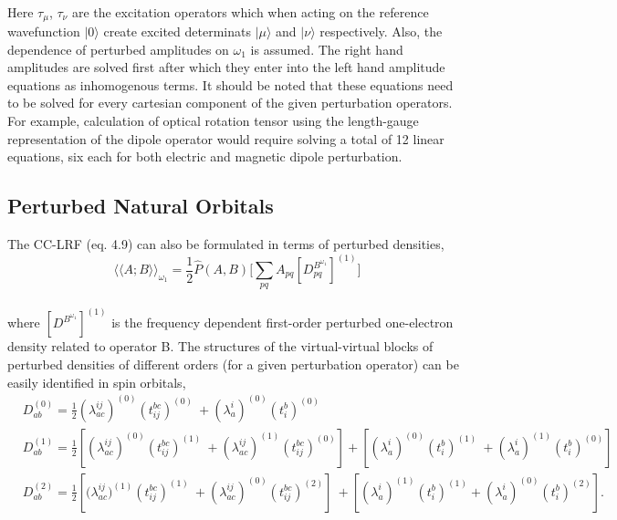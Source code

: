 \\
Here $\tau_\mu$, $\tau_\nu$ are the excitation operators which when acting on the
reference wavefunction $|0\rangle$ create excited determinats $|\mu\rangle$ 
and $|\nu\rangle$ respectively. Also, the dependence of perturbed amplitudes
 on $\omega_1$ is assumed. The right hand amplitudes are solved first after 
which they enter into the left hand amplitude equations as inhomogenous terms. 
It should be noted that these equations need to be solved for every cartesian 
component of the given perturbation operators. For example, calculation of 
optical rotation tensor using the length-gauge representation of the dipole 
operator would require solving a total of 12 linear equations, six each 
for both electric and magnetic dipole perturbation.
\subsection{Perturbed Natural Orbitals}
The CC-LRF (eq. 4.9) can also be formulated in terms of perturbed densities,
\\
\begin{equation}
{\langle\langle A;B\rangle\rangle}_{\omega_1} =  \frac{1}{2}\hat{P}(A,B)\big[\sum_{pq} A_{pq}[{D^{B^{\omega_1}}_{pq}}]^{(1)}\big]
\end{equation}
\\
where $[{D^{B^{\omega_1}}}]^{(1)}$ is the frequency dependent first-order
perturbed one-electron density related to operator B. The structures  
of the virtual-virtual blocks of perturbed densities of different orders
(for a given perturbation operator) can be easily identified in spin orbitals,
\\
\begin{equation}
\begin{split}
& D^{(0)}_{ab} = \frac{1}{2}(\lambda^{ij}_{ac})^{(0)}(t^{bc}_{ij})^{(0)} \
+ (\lambda^{i}_{a})^{(0)}(t^{b}_{i})^{(0)} \\
&D^{(1)}_{ab} = \frac{1}{2}[(\lambda^{ij}_{ac})^{(0)}(t^{bc}_{ij})^{(1)} \
+ (\lambda^{ij}_{ac})^{(1)}(t^{bc}_{ij})^{(0)}] + [(\lambda^{i}_{a})^{(0)}(t^{b}_{i})^{(1)}\
 + (\lambda^{i}_{a})^{(1)}(t^{b}_{i})^{(0)}] \\
&D^{(2)}_{ab} = \frac{1}{2}[{(\lambda^{ij}_{ac}})^{(1)}(t^{bc}_{ij})^{(1)}\
 + (\lambda^{ij}_{ac})^{(0)}(t^{bc}_{ij})^{(2)}]\ 
+ [(\lambda^{i}_{a})^{(1)} (t^{b}_{i})^{(1)} + (\lambda^{i}_{a})^{(0)}(t^{b}_{i})^{(2)}].\\
\end{split}
\end{equation}
